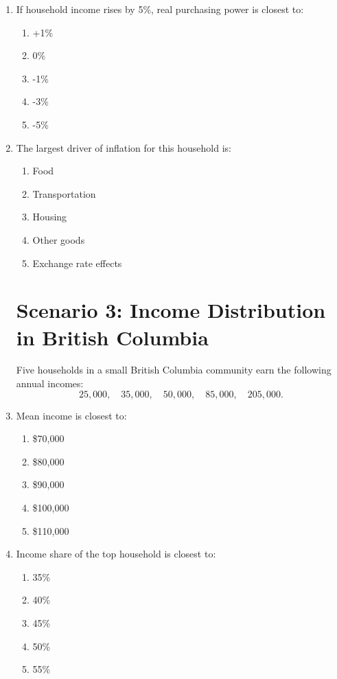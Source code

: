 \documentclass[12pt]{article}
\begin{document}
\begin{enumerate}[label=\textbf{\arabic*.}]
\item If household income rises by 5\%, real purchasing power is closest to:
\begin{enumerate}[label=\Alph*.]
\item +1\%
\item 0\%
\item -1\%
\item -3\%
\item -5\%
\end{enumerate}

\item The largest driver of inflation for this household is:
\begin{enumerate}[label=\Alph*.]
\item Food
\item Transportation
\item Housing
\item Other goods
\item Exchange rate effects
\end{enumerate}

\section*{Scenario 3: Income Distribution in British Columbia}

Five households in a small British Columbia community earn the following annual incomes:
\[
25{,}000,\quad 35{,}000,\quad 50{,}000,\quad 85{,}000,\quad 205{,}000.
\]
\newpage
\item Mean income is closest to:
\begin{enumerate}[label=\Alph*.]
\item \$70,000
\item \$80,000
\item \$90,000
\item \$100,000
\item \$110,000
\end{enumerate}

\item Income share of the top household is closest to:
\begin{enumerate}[label=\Alph*.]
\item 35\%
\item 40\%
\item 45\%
\item 50\%
\item 55\%
\end{enumerate}


\end{enumerate}
\end{document}
